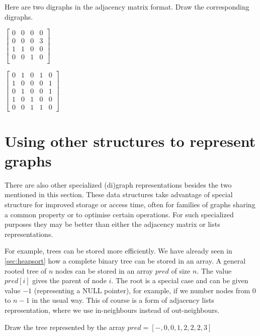 \begin{Boxample}[2]
Here are two digraphs in the adjacency matrix format. Draw the corresponding digraphs.

\vspace{1.5cm}
$\left[
\begin{matrix}
0 & 0 & 0 & 0  \\
0 & 0 & 0 & 3  \\
1 & 1 & 0 & 0  \\
0 & 0 & 1 & 0  \\
\end{matrix}
\right]$

\vspace{2.5cm}
$\left[
\begin{matrix}
0 & 1 & 0 & 1 & 0 \\
1 & 0 & 0 & 0 & 1 \\
0 & 1 & 0 & 0 & 1 \\
1 & 0 & 1 & 0 & 0 \\
0 & 0 & 1 & 1 & 0 
\end{matrix}
\right]$

\end{Boxample}


\section{Using other structures to represent graphs}

There are also other specialized (di)graph representations besides the
two mentioned in this section.  These data structures take advantage of
special structure for improved storage or access time, often for
families of graphs sharing a common property or to optimise certain operations. For such specialized
purposes they may be better than either the adjacency matrix or lists
representations.

For example, trees can be stored more efficiently. We have already
seen in \cref{sec:heapsort} how a complete binary tree can be
stored in an array. A general rooted tree of $n$ nodes can be stored in
an array $pred$ of size $n$. The value $pred[i]$ gives the parent of
node $i$. The root is a special case and can be given value $-1$
(representing a NULL pointer), for example, if we number nodes from $0$
to $n-1$ in the usual way. This of course is a form of adjacency lists
representation, where we use in-neighbours instead of out-neighbours.

\begin{Boxample}[4]
Draw the tree represented by the array $pred = [-,0,0,1,2,2,2,3]$
\end{Boxample}

